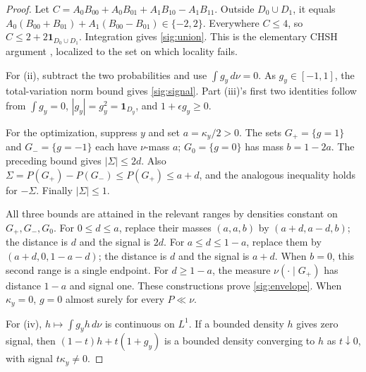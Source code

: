 \documentclass[11pt,a4paper]{article}
\theoremstyle{definition}
\theoremstyle{remark}\newtheorem{remark}[theorem]{Remark}
\begin{document}
\begin{proof}
Let $C=A_0B_{00}+A_0B_{01}+A_1B_{10}-A_1B_{11}$.
Outside $D_0\cup D_1$, it equals
$A_0(B_{00}+B_{01})+A_1(B_{00}-B_{01})\in\{-2,2\}$.
Everywhere $C\le4$, so
$C\le2+2\mathbf1_{D_0\cup D_1}$. Integration gives
\eqref{sig:union}. This is the elementary CHSH argument
\cite{CHSH69}, localized to the set on which locality fails.

For (ii), subtract the two probabilities and use
$\int g_y\,d\nu=0$. As $g_y\in[-1,1]$, the total-variation norm bound
gives \eqref{sig:signal}. Part (iii)'s first two identities follow from
$\int g_y=0$, $|g_y|=g_y^2=\mathbf1_{D_y}$, and
$1+\epsilon g_y\ge0$.

For the optimization, suppress $y$ and set $a=\kappa_y/2>0$.
The sets $G_+=\{g=1\}$ and $G_-=\{g=-1\}$ each have $\nu$-mass $a$;
$G_0=\{g=0\}$ has mass $b=1-2a$. The preceding bound gives
$|\Sigma|\le2d$. Also
$\Sigma=P(G_+)-P(G_-)\le P(G_+)\le a+d$, and the analogous inequality
holds for $-\Sigma$. Finally $|\Sigma|\le1$.

All three bounds are attained in the relevant ranges by densities
constant on $G_+,G_-,G_0$. For $0\le d\le a$, replace their masses
$(a,a,b)$ by $(a+d,a-d,b)$; the distance is $d$ and the signal is $2d$.
For $a\le d\le1-a$, replace them by
$(a+d,0,1-a-d)$; the distance is $d$ and the signal is $a+d$.
When $b=0$, this second range is a single endpoint. For $d\ge1-a$,
the measure $\nu(\cdot\mid G_+)$ has distance $1-a$ and signal one.
These constructions prove \eqref{sig:envelope}. When $\kappa_y=0$,
$g=0$ almost surely for every $P\ll\nu$.

For (iv), $h\mapsto\int g_yh\,d\nu$ is continuous on $L^1$.
If a bounded density $h$ gives zero signal, then
$(1-t)h+t(1+g_y)$ is a bounded density converging to $h$ as
$t\downarrow0$, with signal $t\kappa_y\ne0$.
\end{proof}
\end{document}
